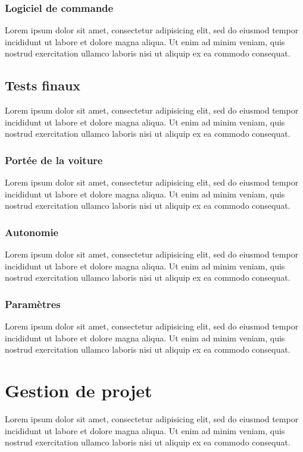 \documentclass[a4paper,12pt]{report}
\begin{document}
		
		\subsection{Logiciel de commande	}
		Lorem ipsum dolor sit amet, consectetur adipisicing elit, sed do eiusmod tempor incididunt ut labore et dolore magna aliqua. Ut enim ad minim veniam, quis nostrud exercitation ullamco laboris nisi ut aliquip ex ea commodo consequat.
		
	\section{Tests finaux}
	Lorem ipsum dolor sit amet, consectetur adipisicing elit, sed do eiusmod tempor incididunt ut labore et dolore magna aliqua. Ut enim ad minim veniam, quis nostrud exercitation ullamco laboris nisi ut aliquip ex ea commodo consequat.
	
		\subsection{Portée de la voiture}
		Lorem ipsum dolor sit amet, consectetur adipisicing elit, sed do eiusmod tempor incididunt ut labore et dolore magna aliqua. Ut enim ad minim veniam, quis nostrud exercitation ullamco laboris nisi ut aliquip ex ea commodo consequat.
		
		\subsection{Autonomie}
		Lorem ipsum dolor sit amet, consectetur adipisicing elit, sed do eiusmod tempor incididunt ut labore et dolore magna aliqua. Ut enim ad minim veniam, quis nostrud exercitation ullamco laboris nisi ut aliquip ex ea commodo consequat.
		
		\subsection{Paramètres}
		Lorem ipsum dolor sit amet, consectetur adipisicing elit, sed do eiusmod tempor incididunt ut labore et dolore magna aliqua. Ut enim ad minim veniam, quis nostrud exercitation ullamco laboris nisi ut aliquip ex ea commodo consequat.



\chapter{Gestion de projet}
Lorem ipsum dolor sit amet, consectetur adipisicing elit, sed do eiusmod tempor incididunt ut labore et dolore magna aliqua. Ut enim ad minim veniam, quis nostrud exercitation ullamco laboris nisi ut aliquip ex ea commodo consequat.
\end{document}
